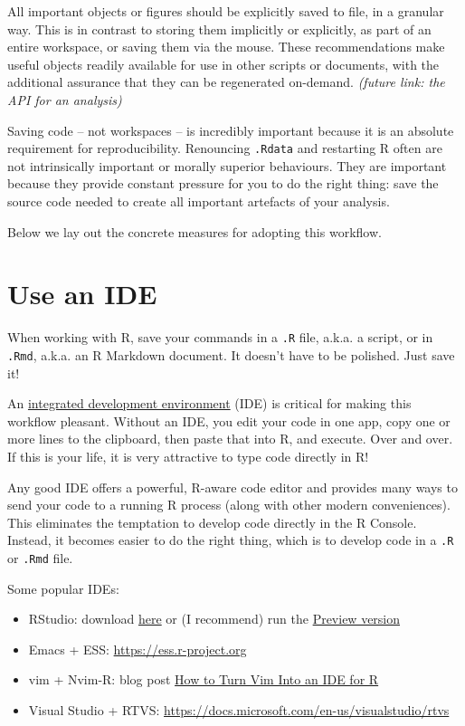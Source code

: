 \documentclass[
  letterpaper,
]{book}
\providecommand{\tightlist}{%
  \setlength{\itemsep}{0pt}\setlength{\parskip}{0pt}}\usepackage{longtable,booktabs,array}
\begin{document}
All important objects or figures should be explicitly saved to file, in
a granular way. This is in contrast to storing them implicitly or
explicitly, as part of an entire workspace, or saving them via the
mouse. These recommendations make useful objects readily available for
use in other scripts or documents, with the additional assurance that
they can be regenerated on-demand. \emph{(future link: the API for an
analysis)}

Saving code -- not workspaces -- is incredibly important because it is
an absolute requirement for reproducibility. Renouncing \texttt{.Rdata}
and restarting R often are not intrinsically important or morally
superior behaviours. They are important because they provide constant
pressure for you to do the right thing: save the source code needed to
create all important artefacts of your analysis.

Below we lay out the concrete measures for adopting this workflow.

\hypertarget{use-an-ide}{%
\section*{Use an IDE}\label{use-an-ide}}

When working with R, save your commands in a \texttt{.R} file, a.k.a. a
script, or in \texttt{.Rmd}, a.k.a. an R Markdown document. It doesn't
have to be polished. Just save it!

An
\href{https://en.wikipedia.org/wiki/Integrated_development_environment}{integrated
development environment} (IDE) is critical for making this workflow
pleasant. Without an IDE, you edit your code in one app, copy one or
more lines to the clipboard, then paste that into R, and execute. Over
and over. If this is your life, it is very attractive to type code
directly in R!

Any good IDE offers a powerful, R-aware code editor and provides many
ways to send your code to a running R process (along with other modern
conveniences). This eliminates the temptation to develop code directly
in the R Console. Instead, it becomes easier to do the right thing,
which is to develop code in a \texttt{.R} or \texttt{.Rmd} file.

Some popular IDEs:

\begin{itemize}
\tightlist
\item
  RStudio: download
  \href{https://www.rstudio.com/products/rstudio/download/\#download}{here}
  or (I recommend) run the
  \href{https://www.rstudio.com/products/rstudio/download/preview/}{Preview
  version}
\item
  Emacs + ESS: \url{https://ess.r-project.org}
\item
  vim + Nvim-R: blog post
  \href{https://medium.com/@kadek/turning-vim-into-an-r-ide-cd9602e8c217}{How
  to Turn Vim Into an IDE for R}
\item
  Visual Studio + RTVS:
  \url{https://docs.microsoft.com/en-us/visualstudio/rtvs}
\end{itemize}
\end{document}

